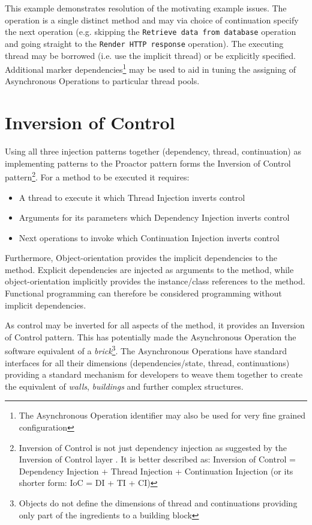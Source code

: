 \documentclass[prodmode]{style/acmlarge}
\begin{document}
This example demonstrates resolution of the motivating example issues.  The
operation is a single distinct method and may via choice of continuation specify
the next operation (e.g. skipping the \texttt{Retrieve data from database}
operation and going straight to the \texttt{Render HTTP response} operation).
The executing thread may be borrowed (i.e. use the implicit thread) or be
explicitly specified.  Additional marker dependencies\footnote{The Asynchronous
Operation identifier may also be used for very fine grained configuration} may
be used to aid in tuning the assigning of Asynchronous Operations to particular
thread pools.


\section{Inversion of Control}

Using all three injection patterns together (dependency, thread, continuation)
as implementing patterns to the Proactor pattern forms the Inversion of Control
pattern\footnote{Inversion of Control is not just dependency injection as
suggested by the Inversion of Control layer \cite{ioc}.  It is better described
as: Inversion of Control = Dependency Injection + Thread Injection +
Continuation Injection (or its shorter form: IoC = DI + TI + CI)}.  For a method
to be executed it requires:

\begin{itemize}
  \item A thread to execute it which Thread Injection inverts control
  \item Arguments for its parameters which Dependency Injection inverts control
  \item Next operations to invoke which Continuation Injection inverts control
\end{itemize}

Furthermore, Object-orientation provides the implicit dependencies to the
method.  Explicit dependencies are injected as arguments to the method, while
object-orientation implicitly provides the instance/class references to the
method.  Functional programming can therefore be considered programming without
implicit dependencies.

As control may be inverted for all aspects of the method, it provides an
Inversion of Control pattern.  This has potentially made the Asynchronous
Operation the software equivalent of a \textit{brick}\footnote{Objects do not
define the dimensions of thread and continuations providing only part of the
ingredients to a building block}.  The Asynchronous Operations have standard
interfaces for all their dimensions (dependencies/state, thread, continuations)
providing a standard mechanism for developers to weave them together to create
the equivalent of \textit{walls}, \textit{buildings} and further complex
structures.
\end{document}
